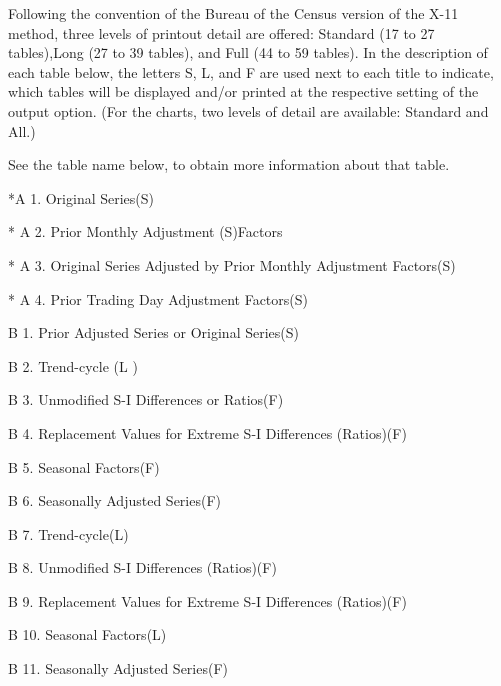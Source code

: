 Following the convention of the Bureau of the Census version of the X-11 method, three levels of printout detail are offered: Standard (17 to 27 tables),Long (27 to 39 tables), and Full (44 to 59 tables). In the description of each table below, the letters S, L, and F are used next to each title to indicate, which tables will be displayed and/or printed at the respective setting of the output option. (For the charts, two levels of detail are available: Standard and All.)

See the table name below, to obtain more information about that table.








*A 1. Original Series(S) 
 



* A 2. Prior Monthly Adjustment (S)Factors 
 



* A 3. Original Series Adjusted by Prior Monthly Adjustment Factors(S) 
 



* A 4. Prior Trading Day Adjustment Factors(S) 
 



B 1. Prior Adjusted Series or Original Series(S) 
 



B 2. Trend-cycle (L ) 
 



B 3. Unmodified S-I Differences or Ratios(F) 
 



B 4. Replacement Values for Extreme S-I Differences (Ratios)(F) 
 



B 5. Seasonal Factors(F) 
 



B 6. Seasonally Adjusted Series(F) 
 



B 7. Trend-cycle(L) 
 



B 8. Unmodified S-I Differences (Ratios)(F) 
 



B 9. Replacement Values for Extreme S-I Differences (Ratios)(F) 
 



B 10. Seasonal Factors(L) 
 



B 11. Seasonally Adjusted Series(F) 
 



